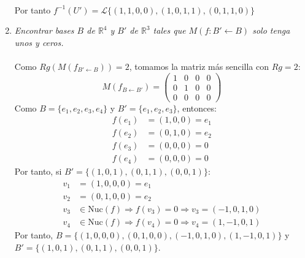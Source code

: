 \begin{ejercicio}
\begin{enumerate}
\begin{align*}
		      \end{align*}
		      Por tanto $f^{-1}(U') = \mathcal{L}\{(1,1,0,0),(1,0,1,1),(0,1,1,0)\}$
		\item \textit{Encontrar bases \( B \) de \( \mathbb{R}^4 \) y \( B' \) de \( \mathbb{R}^3 \) tales que $M(f:B' \leftarrow B)$ solo tenga unos y ceros.}
		      \\ \\
		      Como $Rg(M(f_{B' \leftarrow B})) = 2$, tomamos la matriz más sencilla con $Rg = 2$:
		      \begin{equation*}
			      M(f_{B \leftarrow B'}) = \begin{pmatrix}
				      1 & 0 & 0 & 0 \\
				      0 & 1 & 0 & 0 \\
				      0 & 0 & 0 & 0
			      \end{pmatrix}
		      \end{equation*}
		      Como $B=\{e_1,e_2,e_3,e_4\}$ y $B'=\{e_1,e_2,e_3\}$, entonces:
		      \begin{align*}
			      f(e_1) & = (1,0,0) = e_1 \\
			      f(e_2) & = (0,1,0) = e_2 \\
			      f(e_3) & = (0,0,0) = 0   \\
			      f(e_4) & = (0,0,0) = 0
		      \end{align*}
		      Por tanto, si $B'=\{(1,0,1),(0,1,1),(0,0,1)\}$:
		      \begin{align*}
			      v_1 & = (1,0,0,0) = e_1                                                     \\
			      v_2 & = (0,1,0,0) = e_2                                                     \\
			      v_3 & \in \text{Nuc}(f) \Rightarrow f(v_3) = 0 \Rightarrow v_3 = (-1,0,1,0) \\
			      v_4 & \in \text{Nuc}(f) \Rightarrow f(v_4) = 0 \Rightarrow v_4 = (1,-1,0,1)
		      \end{align*}
		      Por tanto, $B=\{(1,0,0,0),(0,1,0,0),(-1,0,1,0),(1,-1,0,1)\}$ y\\ $B'=\{(1,0,1),(0,1,1),(0,0,1)\}$.
	\end{enumerate}
\end{ejercicio}


